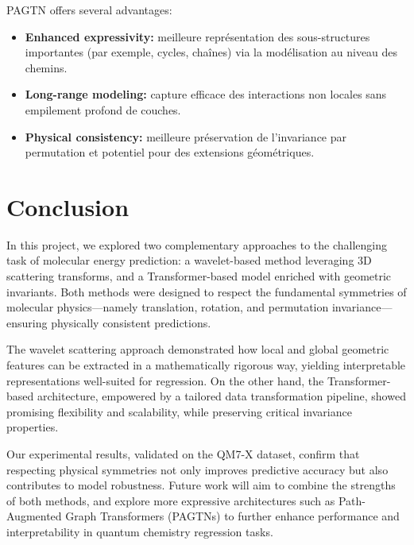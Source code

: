 \documentclass{article}
\begin{document}
PAGTN offers several advantages:
\vspace{0.2cm}
\begin{itemize}
  \item \textbf{Enhanced expressivity:} meilleure représentation des sous-structures importantes (par exemple, cycles, chaînes) via la modélisation au niveau des chemins.
  \vspace{0.2cm}
  \item \textbf{Long-range modeling:} capture efficace des interactions non locales sans empilement profond de couches.
  \vspace{0.2cm}
  \item \textbf{Physical consistency:} meilleure préservation de l'invariance par permutation et potentiel pour des extensions géométriques.
\end{itemize}
\vspace{0.2cm}




\section*{Conclusion}

In this project, we explored two complementary approaches to the challenging task of molecular energy prediction: a wavelet-based method leveraging 3D scattering transforms, and a Transformer-based model enriched with geometric invariants. Both methods were designed to respect the fundamental symmetries of molecular physics—namely translation, rotation, and permutation invariance—ensuring physically consistent predictions. \newline

The wavelet scattering approach demonstrated how local and global geometric features can be extracted in a mathematically rigorous way, yielding interpretable representations well-suited for regression. On the other hand, the Transformer-based architecture, empowered by a tailored data transformation pipeline, showed promising flexibility and scalability, while preserving critical invariance properties. \newline

Our experimental results, validated on the QM7-X dataset, confirm that respecting physical symmetries not only improves predictive accuracy but also contributes to model robustness. Future work will aim to combine the strengths of both methods, and explore more expressive architectures such as Path-Augmented Graph Transformers (PAGTNs) to further enhance performance and interpretability in quantum chemistry regression tasks. \newline
\end{document}
